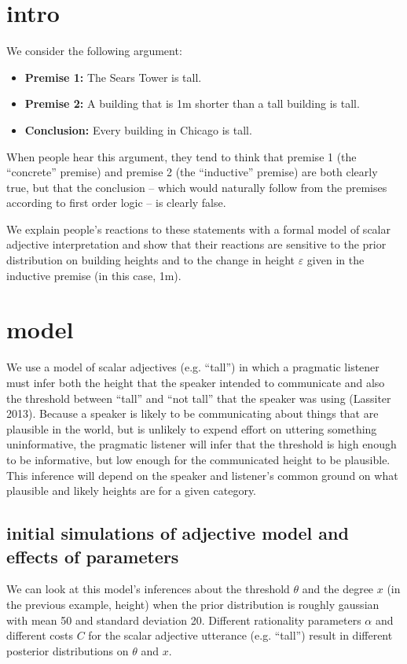 \documentclass[10pt]{article}
\begin{document}
\setlength{\droptitle}{-1.5cm}
\maketitle

\section{intro}
  We consider the following argument:
  
  \begin{itemize}
   \item[] \textbf{Premise 1:} The Sears Tower is tall.
   \item[] \textbf{Premise 2:} A building that is 1m shorter than a tall building is tall.
   \item[] \textbf{Conclusion:} Every building in Chicago is tall.
  \end{itemize}
  
  When people hear this argument, they tend to think that premise 1 (the ``concrete'' premise) and premise 2 (the ``inductive'' premise) are both clearly true, but that the conclusion -- which would naturally follow from the premises according to first order logic -- is clearly false.
  
  We explain people's reactions to these statements with a formal model of scalar adjective interpretation and show that their reactions are sensitive to the prior distribution on building heights and to the change in height $\varepsilon$ given in the inductive premise (in this case, 1m).
  
\section{model}
  We use a model of scalar adjectives (e.g. ``tall'') in which a pragmatic listener must infer both the height that the speaker intended to communicate and also the threshold between ``tall'' and ``not tall'' that the speaker was using (Lassiter 2013). Because a speaker is likely to be communicating about things that are plausible in the world, but is unlikely to expend effort on uttering something uninformative, the pragmatic listener will infer that the threshold is high enough to be informative, but low enough for the communicated height to be plausible. This inference will depend on the speaker and listener's common ground on what plausible and likely heights are for a given category.
  
  \subsection{initial simulations of adjective model and effects of parameters}
    We can look at this model's inferences about the threshold $\theta$ and the degree $x$ (in the previous example, height) when the prior distribution is roughly gaussian with mean 50 and standard deviation 20. Different rationality parameters $\alpha$ and different costs $C$ for the scalar adjective utterance (e.g. ``tall'') result in different posterior distributions on $\theta$ and $x$.
    
\end{document}
